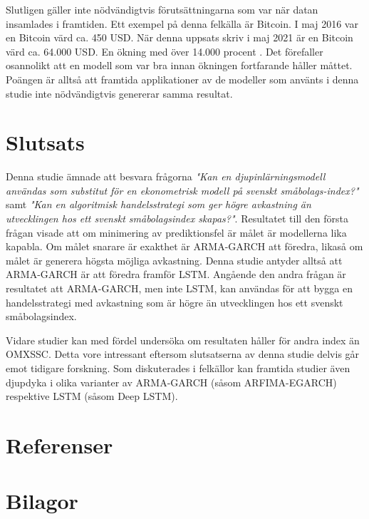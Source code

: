 \documentclass[11pt]{article}
\numberwithin{equation}{section}
\numberwithin{table}{section}
\numberwithin{figure}{section}
\begin{document}
Slutligen gäller inte nödvändigtvis förutsättningarna som var när datan insamlades i framtiden. Ett exempel på denna felkälla är Bitcoin. I maj 2016 var en Bitcoin värd ca. 450 USD. När denna uppsats skriv i maj 2021 är en Bitcoin värd ca. 64.000 USD. En ökning med över 14.000 procent \parencite{yahoo_bitcoin}. Det förefaller osannolikt att en modell som var bra innan ökningen fortfarande håller måttet. Poängen är alltså att framtida applikationer av de modeller som använts i denna studie inte nödvändigtvis genererar samma resultat.

\section{Slutsats}
Denna studie ämnade att besvara frågorna \emph{"Kan en djupinlärningsmodell  användas som substitut för en ekonometrisk modell på svenskt småbolags-index?"} samt \emph{"Kan en algoritmisk handelsstrategi som ger högre avkastning än utvecklingen hos ett svenskt småbolagsindex skapas?"}. Resultatet till den första frågan visade att om minimering av prediktionsfel är målet är modellerna lika kapabla. Om målet snarare är exakthet är ARMA-GARCH att föredra, likaså om målet är generera högsta möjliga avkastning. Denna studie antyder alltså att ARMA-GARCH är att föredra framför LSTM. Angående den andra frågan är resultatet att ARMA-GARCH, men inte LSTM, kan användas för att bygga en handelsstrategi med avkastning som är högre än utvecklingen hos ett svenskt småbolagsindex.

Vidare studier kan med fördel undersöka om resultaten håller för andra index än OMXSSC. Detta vore intressant eftersom slutsatserna av denna studie delvis går emot tidigare forskning. Som diskuterades i felkällor kan framtida studier även djupdyka i olika varianter av ARMA-GARCH (såsom ARFIMA-EGARCH) respektive LSTM (såsom Deep LSTM).



\newpage
\section*{Referenser}
\printbibliography[heading=none]




\newpage

\appendix
\section*{Bilagor}
\renewcommand{\thesubsection}{\Alph{subsection}}
\end{document}
